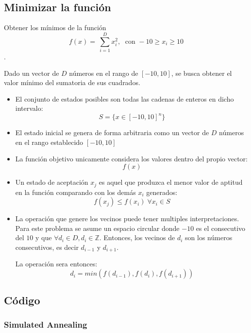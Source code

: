 \documentclass[12pt,twoside]{article}
\begin{document}
	\subsection{Minimizar la función}
	
	Obtener los mínimos de la función \[ f(x) = \ \sum_{i = 1}^{D} x_i^2, \; \text{ con } -10 \geq x_i \geq 10 \].
	
	Dado un vector de $D$ números en el rango de $[-10, 10]$, se busca obtener el valor mínimo del sumatoria  de sus cuadrados.
	
	\begin{itemize}
		\item El conjunto de estados posibles son todas las cadenas de enteros en dicho intervalo: \[ S = \{ x \in [-10, 10]^n \} \]
		
		\item El estado inicial se genera de forma arbitraria como un vector de $D$ números en el rango establecido $[-10, 10]$
		
		\item La función objetivo unicamente considera los valores dentro del propio vector: \[f(x) \]
		
		\item Un estado de aceptación $x_j$ es aquel que produzca el menor valor de aptitud en la función comparando con los demás $x_i$ generados: \[ f(x_j) \leq f(x_i) \; \forall x_i \in S\] 
		
		\item La operación que genere los vecinos puede tener multiples interpretaciones. Para este problema se asume un espacio circular donde $-10$ es el consecutivo del $10$ y que $\forall d_i \in D, d_i \in \mathbb{Z}$.  Entonces, los vecinos de $d_i$ son los números consecutivos, es decir $d_{i-1}$ y $d_{i+1}$.
		
		La operación sera entonces:
		\[ d_i = min(f(d_{i-1}), f(d_i), f(d_{i+1})) \]	
	\end{itemize}
	
	\clearpage
	\subsection{Código}
	
	\subsubsection{Simulated Annealing}
	
\end{document}
